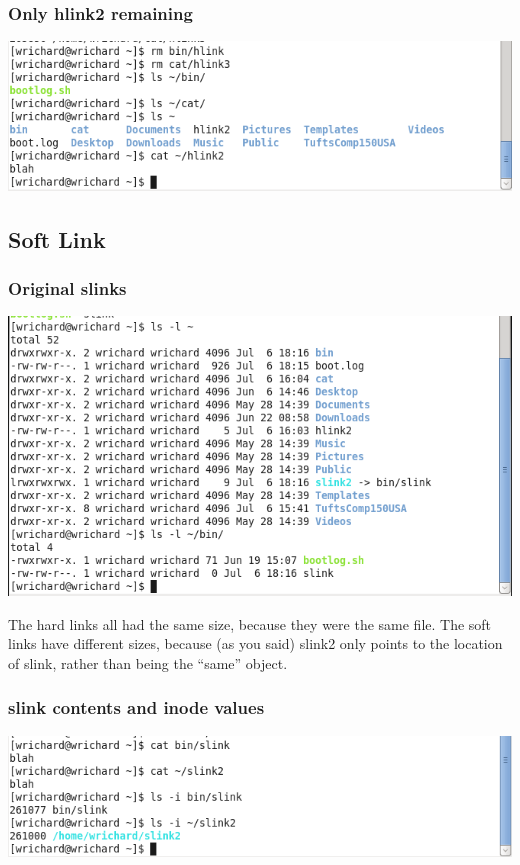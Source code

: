 \documentclass[a4paper,10pt]{article}
\begin{document}
\subsubsection{Only hlink2 remaining}
  \begin{center}
  \includegraphics[width=\linewidth]{./rmhlink.png}
  \end{center}

\subsection{Soft Link}
\subsubsection{Original slinks}
  \begin{center}
  \includegraphics[width=\linewidth]{./slink_empty.png}
  \end{center}
The hard links all had the same size, because they were the same file. The soft links have different sizes, because (as you said) slink2 only points to the location of slink, rather than being the ``same'' object.
\subsubsection{slink contents and inode values}
  \begin{center}
  \includegraphics[width=\linewidth]{./slink_inode.png}
  \end{center}
\end{document}
